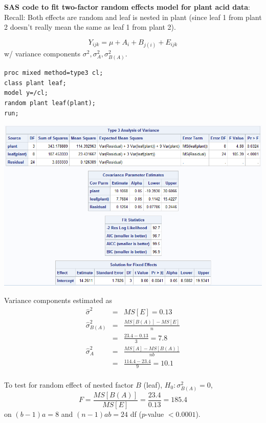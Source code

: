 \newpage

\textbf{SAS code to fit two-factor random effects model for plant acid data}:\\
Recall:  Both effects are random and leaf is nested in plant (since leaf 1 from plant 2 doesn't really mean the same as leaf 1 from plant 2).

$$Y_{ijk} = \mu + A_i + B_{j(i)} + E_{ijk}$$
w/ variance components $\sigma^2,\sigma_A^2,\sigma_{B(A)}^2$.\\

\begin{small}
\begin{verbatim}
proc mixed method=type3 cl;
class plant leaf;
model y=/cl;
random plant leaf(plant);
run;
\end{verbatim}
\end{small}

\begin{center}
\includegraphics[scale=0.7]{Plant}
\end{center}

Variance components estimated as
\begin{eqnarray*}
\hat\sigma^2 & = & MS[E]  =  0.13 \\
\hat\sigma_{B(A)}^2 & = & \frac{MS[B(A)]-MS[E]}{n} \\
& = & \frac{23.4-0.13}{3}  =  7.8  \\
\hat\sigma_{A}^2 & = & \frac{MS[A]-MS[B(A)]}{nb} \\
& = & \frac{114.4-23.4}{9}  =  10.1
\end{eqnarray*}
~\\
To test for random effect of nested factor $B$ (leaf), $H_0: \sigma_{B(A)}^2=0$,
$$ F=\frac{MS[B(A)]}{MS[E]}=\frac{23.4}{0.13}=185.4$$ 
on $(b-1)a=8$ and $(n-1)ab=24$ df  ($p$-value $<0.0001$).\\~\\

